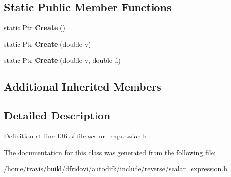 \subsection*{Static Public Member Functions}
\begin{DoxyCompactItemize}
\item 
\hypertarget{classautodifk_1_1reverse_1_1_constant_scalar_expression_a0408fecd73c15d83ef9bd23dd0af7c09}{static Ptr {\bfseries Create} ()}\label{classautodifk_1_1reverse_1_1_constant_scalar_expression_a0408fecd73c15d83ef9bd23dd0af7c09}

\item 
\hypertarget{classautodifk_1_1reverse_1_1_constant_scalar_expression_a58c272a8761a2939d387616ef090a45a}{static Ptr {\bfseries Create} (double v)}\label{classautodifk_1_1reverse_1_1_constant_scalar_expression_a58c272a8761a2939d387616ef090a45a}

\item 
\hypertarget{classautodifk_1_1reverse_1_1_constant_scalar_expression_ad9bd2a7328e438bb502955123c61f140}{static Ptr {\bfseries Create} (double v, double d)}\label{classautodifk_1_1reverse_1_1_constant_scalar_expression_ad9bd2a7328e438bb502955123c61f140}

\end{DoxyCompactItemize}
\subsection*{Additional Inherited Members}


\subsection{Detailed Description}


Definition at line 136 of file scalar\-\_\-expression.\-h.



The documentation for this class was generated from the following file\-:\begin{DoxyCompactItemize}
\item 
/home/travis/build/dfridovi/autodifk/include/reverse/scalar\-\_\-expression.\-h\end{DoxyCompactItemize}

